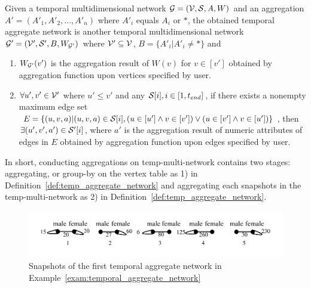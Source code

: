 \documentclass[10pt,journal,compsoc]{IEEEtran}
\begin{document}
\begin{definition}
	\label{def:temp_aggregate_network}
	Given a temporal multidimensional network $\mathcal{G}=(\mathcal{V},\mathcal{S},A,W)$ and an aggregation $A'=(A'_1,A'_2,...,A'_n)$ where $A'_i$ equals $A_i$ or $\ast$, the obtained temporal aggregate network is another temporal multidimensional network $\mathcal{G}'=(\mathcal{V}',\mathcal{S}',B,W_{\mathcal{G}'})$ where $\mathcal{V}' \subseteq \mathcal{V}$, $B=\{A'_i|A'_i \neq \ast\}$ and
	\begin{enumerate}
		\item {} $W_{\mathcal{G}'}(v')$ is the aggregation result of $W(v)$ for $v \in [v']$ obtained by aggregation function upon vertices specified by user.
		\item $\forall u',v' \in \mathcal{V}'$ where $u' \leq v'$ and any $\mathcal{S}[i], i \in [1,t_{end}]$, if there exists a nonempty maximum edge set $E=\{(u,v,a)|(u,v,a) \in \mathcal{S}[i],(u \in [u'] \wedge v \in [v']) \vee (u \in [v'] \wedge v \in [u']) \}$, then $ \exists (u',v',a') \in \mathcal{S}'[i] $, where $a'$ is the aggregation result of numeric attributes of edges in $E$ obtained by aggregation function upon edges specified by user.
	\end{enumerate}
\end{definition}
In short, conducting aggregations on temp-multi-network contains two stages: aggregating, or group-by on the vertex table as 1) in Definition~\ref{def:temp_aggregate_network} and aggregating each snapshots in the temp-multi-network as 2) in Definition~\ref{def:temp_aggregate_network}.

\begin{figure}[t!]
	\begin{center}
		\includegraphics[width=0.95\columnwidth]{fig/example/exam_aggregate_gender.pdf}
	\end{center}
	\vspace*{-0.9cm}
	\caption{Snapshots of the first temporal aggregate network in Example~\ref{exam:temporal_aggregate_network}}
	\vspace*{-0.4cm}
	\label{fig:aggregation_gender}
\end{figure}
\end{document}
